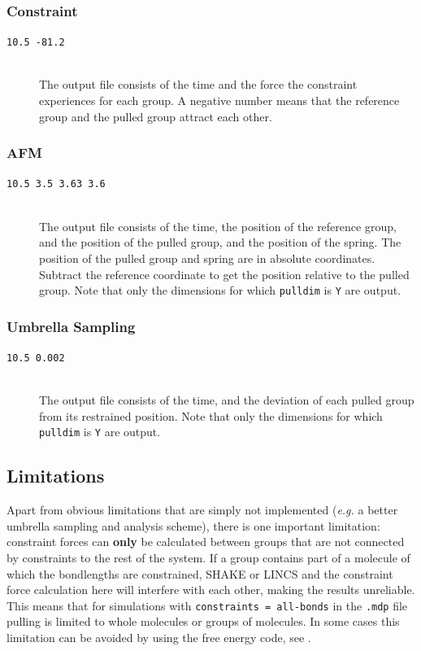 \subsubsection{Constraint}
\begin{description}
\item[\tt 10.5     -81.2]\mbox{}\\
The output file consists of the time and the force the constraint
experiences for each group. A negative number means that the
reference group and the pulled group attract each other.
\end{description}

\subsubsection{AFM}
\begin{description}
\item[\tt 10.5     3.5     3.63     3.6]\mbox{}\\
The output file consists of the time, the position of the reference
group, and the position of the pulled group, and the position
of the spring. The position of the pulled group and spring are in
absolute coordinates. Subtract the reference coordinate to get the
position relative to the pulled group. Note that only the 
dimensions for which {\tt pulldim} is {\tt Y} are output.
\end{description}

\subsubsection{Umbrella Sampling}
\begin{description}
\item[\tt 10.5     0.002]\mbox{}\\
The output file consists of the time, and the deviation of each pulled
group from its restrained position. Note that only the dimensions for which {\tt pulldim}
is {\tt Y} are output.
\end{description}

\subsection{Limitations}
Apart from obvious limitations that are simply not implemented (\emph{e.g.} a
better umbrella sampling and analysis scheme), there is one important
limitation: constraint forces can \textbf{only} be calculated between
groups that are not connected by constraints to the rest of the system.
If a group contains part of a molecule of which the bondlengths
are constrained, SHAKE or LINCS and the constraint force calculation
here will interfere with each other, making the results unreliable.
This means that for simulations with {\tt constraints = all-bonds}
in the {\tt .mdp} file
pulling is limited to whole molecules or groups of molecules.
In some cases this limitation can be avoided by using the free energy code,
see .

